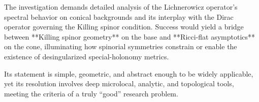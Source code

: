 The investigation demands detailed analysis of the Lichnerowicz operator’s spectral behavior on conical backgrounds and its interplay with the Dirac operator governing the Killing spinor condition. Success would yield a bridge between **Killing spinor geometry** on the base and **Ricci-flat asymptotics** on the cone, illuminating how spinorial symmetries constrain or enable the existence of desingularized special-holonomy metrics.  

Its statement is simple, geometric, and abstract enough to be widely applicable, yet its resolution involves deep microlocal, analytic, and topological tools, meeting the criteria of a truly “good” research problem.